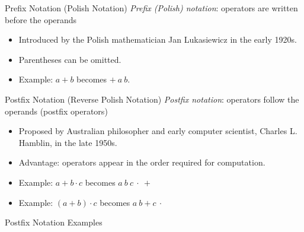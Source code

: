 \documentclass[14pt,aspectratio=1610]{beamer}
\begin{document}
\begin{frame}{Prefix Notation (Polish Notation)}
\emph{Prefix (Polish) notation}: operators are written before the operands
\begin{itemize}
\item
  Introduced by the Polish mathematician Jan Lukasiewicz in the early 1920s.
\item
  Parentheses can be omitted.
\item
  Example: $a + b$ becomes $+\ a\ b$.
\end{itemize}
\end{frame}

\begin{frame}{Postfix Notation (Reverse Polish Notation)}
\emph{Postfix notation}: operators follow the operands (postfix operators)

\begin{itemize}
\item
  Proposed by Australian philosopher and early computer scientist, Charles L. Hamblin, in the late 1950s.
\item
  Advantage: operators appear in the order required for computation.
\item
  Example: $a + b \cdot c$ becomes $a\ b\ c\ \cdot\ +$
\item
  Example: $(a + b) \cdot c$ becomes $a\ b + c\ \cdot$
\end{itemize}
\end{frame}

\begin{frame}{Postfix Notation Examples}
\end{frame}
\end{document}
